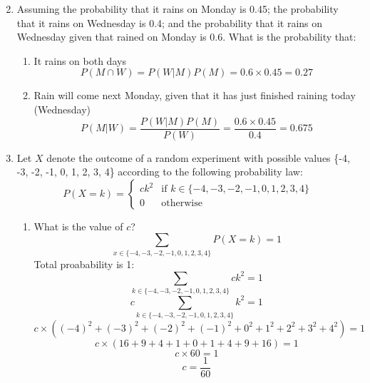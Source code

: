 \documentclass[a3paper,12pt]{extarticle} %
\begin{document}
\begin{enumerate}
\begin{enumerate}
\[        \]
    \end{enumerate}
    \item Assuming the probability that it rains on Monday is 0.45; the probability that it rains on Wednesday is 0.4; and the probability that it rains on Wednesday given that rained on Monday is 0.6. What is the probability that:
    \begin{enumerate}
        \item It rains on both days
        \[
            P(M \cap W) = P(W | M)P(M) = 0.6 \times 0.45 = 0.27
        \]
        \item Rain will come next Monday, given that it has just finished raining today (Wednesday)
        \[
            P(M | W) = \frac{P(W | M)P(M)}{P(W)} = \frac{0.6 \times 0.45}{0.4} = 0.675
        \]
    \end{enumerate}
    \item Let \(X\) denote the outcome of a random experiment with possible values \{-4, -3, -2, -1, 0, 1, 2, 3, 4\} according to the following probability law:
    \[
        P(X = k) = 
    \begin{cases}
        ck^2 & \text{if } k \in \{-4, -3, -2, -1, 0, 1, 2, 3, 4\} \\
        0 & \text{otherwise}
    \end{cases}
    \]
    \begin{enumerate}
        \item What is the value of \(c\)?
        \[
            \sum_{x \in \{-4, -3, -2, -1, 0, 1, 2, 3, 4\}} P(X = k) = 1
        \]
        Total proabability is 1:
        \[
            \sum_{k \in \{-4, -3, -2, -1, 0, 1, 2, 3, 4\}} ck^2 = 1
        \]
        \[
            c \sum_{k \in \{-4, -3, -2, -1, 0, 1, 2, 3, 4\}} k^2 = 1
        \]
        \[
            c \times( (-4)^2 + (-3)^2 + (-2)^2 + (-1)^2 + 0^2 + 1^2 + 2^2 + 3^2 + 4^2) = 1
        \]
        \[
            c \times( 16 + 9 + 4 + 1 + 0 + 1 + 4 + 9 + 16) = 1
        \]
        \[
            c \times 60 = 1
        \]
        \[
            c = \frac{1}{60}
        \]
        

\end{enumerate}
\end{enumerate}
\end{document}
